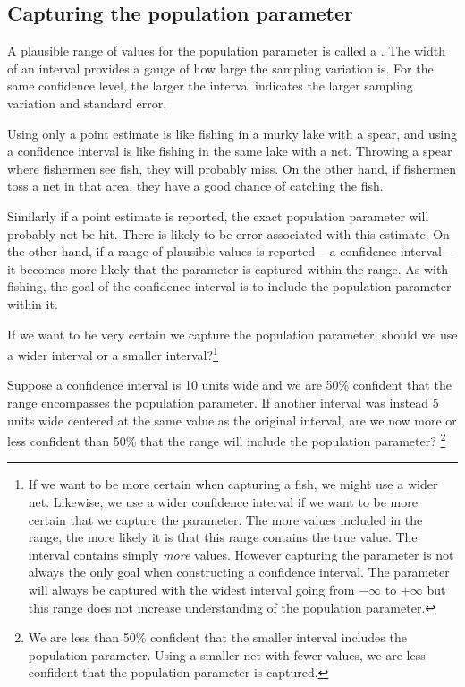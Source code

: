 \subsection{Capturing the population parameter}

A plausible range of values for the population parameter is called a . The width of an interval provides a gauge of how large the sampling variation is. For the same confidence level, the larger the interval indicates the larger sampling variation and standard error.

Using only a point estimate is like fishing in a murky lake with a spear, and using a confidence interval is like fishing in the same lake with a net. Throwing a spear where fishermen see fish, they will probably miss. On the other hand, if fishermen toss a net in that area, they have a good chance of catching the fish.

Similarly if a point estimate is reported, the exact population parameter will probably not be hit. There is likely to be error associated with this estimate. On the other hand, if a range of plausible values is reported -- a confidence interval -- it becomes more likely that the parameter is captured within the range. As with fishing, the goal of the confidence interval is to include the population parameter within it. 

\begin{exercise}
If we want to be very certain we capture the population parameter, should we use a wider interval or a smaller interval?\footnote{If we want to be more certain when capturing a fish, we might use a wider net. Likewise, we use a wider confidence interval if we want to be more certain that we capture the parameter. The more values included in the range, the more likely it is that this range contains the true value. The interval contains simply \emph{more} values. However capturing the parameter is not always the only goal when constructing a confidence interval. The parameter will always be captured with the widest interval going from $-\infty$ to $+\infty$ but this range does not increase understanding of the population parameter. } 
\end{exercise}
\begin{exercise}
Suppose a confidence interval is 10 units wide and we are 50\% confident that the range encompasses the population parameter. If another interval was instead 5 units wide centered at the same value as the original interval, are we now more or less confident than 50\% that the range will include the population parameter? \footnote{We are less than 50\% confident that the smaller interval includes the population parameter. Using a smaller net with fewer values, we are less confident that the population parameter is captured.}
\end{exercise}

